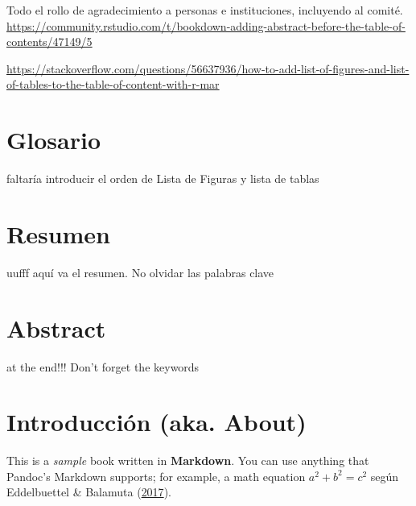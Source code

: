 \documentclass[
  11pt,
  twoside]{book}
\theoremstyle{definition}
\theoremstyle{definition}
\theoremstyle{definition}
\theoremstyle{definition}
\theoremstyle{remark}
\begin{document}
Todo el rollo de agradecimiento a personas e instituciones, incluyendo al comité.
\url{https://community.rstudio.com/t/bookdown-adding-abstract-before-the-table-of-contents/47149/5}

\url{https://stackoverflow.com/questions/56637936/how-to-add-list-of-figures-and-list-of-tables-to-the-table-of-content-with-r-mar}

\newpage

\tableofcontents
\listoffigures
\listoftables

\newpage

\hypertarget{glosario}{%
\chapter*{Glosario}\label{glosario}}

faltaría introducir el orden de Lista de Figuras y lista de tablas

\newpage

\hypertarget{resumen}{%
\chapter*{Resumen}\label{resumen}}

uufff aquí va el resumen. No olvidar las palabras clave

\newpage

\hypertarget{abstract}{%
\chapter*{Abstract}\label{abstract}}

at the end!!! Don't forget the keywords

\mainmatter
\fancyfoot[LE,RO]{\thepage}

\hypertarget{introducciuxf3n-aka.-about}{%
\chapter*{Introducción (aka. About)}\label{introducciuxf3n-aka.-about}}

This is a \emph{sample} book written in \textbf{Markdown}. You can use anything that Pandoc's Markdown supports; for example, a math equation \(a^2 + b^2 = c^2\) según Eddelbuettel \& Balamuta (\protect\hyperlink{ref-eddelbuettel2017ExtendingBrief}{2017}).
\end{document}
